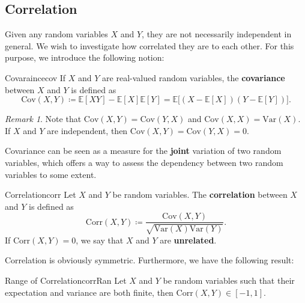 \documentclass[math, code]{amznotes}
\theoremstyle{remark}
\newtheorem*{remark}{Remark}
\begin{document}
\subsection{Correlation}
Given any random variables $X$ and $Y$, they are not necessarily independent in general. We wish to investigate how correlated they are to each other. For this purpose, we introduce the following notion:
\begin{dfnbox}{Covaraince}{cov}
    If $X$ and $Y$ are real-valued random variables, the {\color{red} \textbf{covariance}} between $X$ and $Y$ is defined as
    \begin{equation*}
        \mathrm{Cov}\left(X, Y\right) \coloneqq \mathbb{E}\left[XY\right] - \mathbb{E}\left[X\right]\mathbb{E}\left[Y\right] = \mathbb{E}\bigl[\left(X - \mathbb{E}\left[X\right]\right)\left(Y - \mathbb{E}\left[Y\right]\right)\bigr].
    \end{equation*}
\end{dfnbox}
\begin{notebox}
    \begin{remark}
        Note that $\mathrm{Cov}\left(X, Y\right) = \mathrm{Cov}\left(Y, X\right)$ and $\mathrm{Cov}\left(X, X\right) = \mathrm{Var}\left(X\right)$. If $X$ and $Y$ are independent, then $\mathrm{Cov}\left(X, Y\right) = \mathrm{Cov}\left(Y, X\right) = 0$.
    \end{remark}
\end{notebox}
Covariance can be seen as a measure for the \textbf{joint} variation of two random variables, which offers a way to assess the dependency between two random variables to some extent.
\begin{dfnbox}{Correlation}{corr}
    Let $X$ and $Y$ be random variables. The {\color{red} \textbf{correlation}} between $X$ and $Y$ is defined as 
    \begin{equation*}
        \mathrm{Corr}\left(X, Y\right) \coloneqq \frac{\mathrm{Cov}\left(X, Y\right)}{\sqrt{\mathrm{Var}\left(X\right)\mathrm{Var}\left(Y\right)}}.
    \end{equation*}
    If $\mathrm{Corr}\left(X, Y\right) = 0$, we say that $X$ and $Y$ are {\color{red} \textbf{unrelated}}.
\end{dfnbox}
Correlation is obviously symmetric. Furthermore, we have the following result:
\begin{probox}{Range of Correlation}{corrRan}
    Let $X$ and $Y$ be random variables such that their expectation and variance are both finite, then $\mathrm{Corr}\left(X, Y\right) \in \left[-1, 1\right]$. 
\end{probox}
\end{document}
